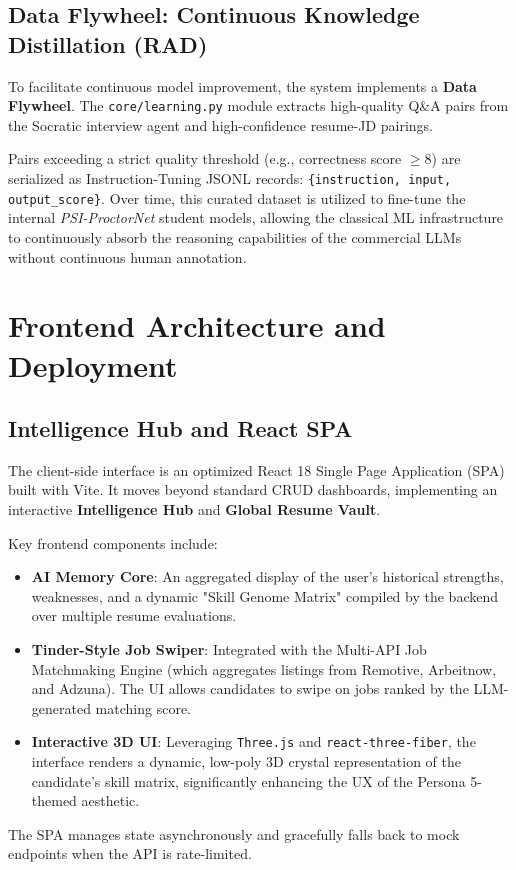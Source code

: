 \documentclass[10pt,journal,compsoc]{IEEEtran}
\begin{document}
\subsection{Data Flywheel: Continuous Knowledge Distillation (RAD)}
To facilitate continuous model improvement, the system implements a \textbf{Data Flywheel}. The \texttt{core/learning.py} module extracts high-quality Q\&A pairs from the Socratic interview agent and high-confidence resume-JD pairings. 

Pairs exceeding a strict quality threshold (e.g., correctness score $\geq 8$) are serialized as Instruction-Tuning JSONL records: \texttt{\{instruction, input, output\_score\}}. Over time, this curated dataset is utilized to fine-tune the internal \textit{PSI-ProctorNet} student models, allowing the classical ML infrastructure to continuously absorb the reasoning capabilities of the commercial LLMs without continuous human annotation.


\section{Frontend Architecture and Deployment}\label{sec:frontend}

\subsection{Intelligence Hub and React SPA}
The client-side interface is an optimized React 18 Single Page Application (SPA) built with Vite. It moves beyond standard CRUD dashboards, implementing an interactive \textbf{Intelligence Hub} and \textbf{Global Resume Vault}.

Key frontend components include:
\begin{itemize}
    \item \textbf{AI Memory Core}: An aggregated display of the user's historical strengths, weaknesses, and a dynamic "Skill Genome Matrix" compiled by the backend over multiple resume evaluations.
    \item \textbf{Tinder-Style Job Swiper}: Integrated with the Multi-API Job Matchmaking Engine (which aggregates listings from Remotive, Arbeitnow, and Adzuna). The UI allows candidates to swipe on jobs ranked by the LLM-generated matching score.
    \item \textbf{Interactive 3D UI}: Leveraging \texttt{Three.js} and \texttt{react-three-fiber}, the interface renders a dynamic, low-poly 3D crystal representation of the candidate's skill matrix, significantly enhancing the UX of the Persona 5-themed aesthetic.
\end{itemize}
The SPA manages state asynchronously and gracefully falls back to mock endpoints when the API is rate-limited.
\end{document}
